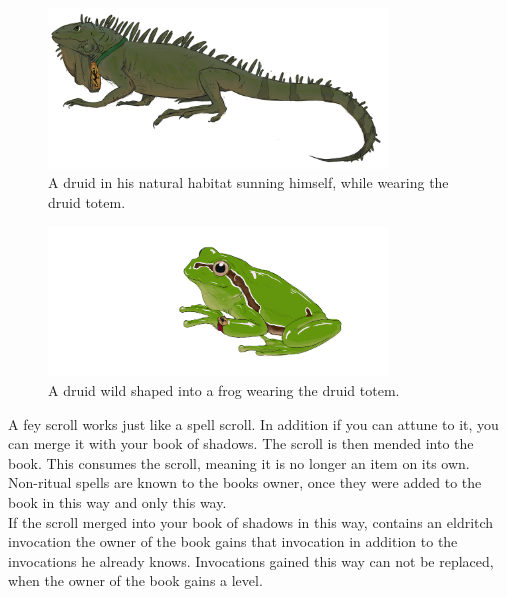 \documentclass[letter,10pt,twocolumn,openany]{dndbook}
\begin{document}
\begin{figure}
    \includegraphics[width=9cm]{images/iguana.png}
    \caption{A druid in his natural habitat sunning himself, while wearing the druid totem.}
\end{figure}

\begin{figure}
    \includegraphics[width=9cm]{images/frog.png}
    \caption{A druid wild shaped into a frog wearing the druid totem.}
\end{figure}

\pagebreak


A fey scroll works just like a spell scroll. In addition if you can attune to it, you can merge it with your book of shadows. The scroll is then mended into the book. This consumes the scroll, meaning it is no longer an item on its own.\\
Non-ritual spells are known to the books owner, once they were added to the book in this way and only this way.\\
If the scroll merged into your book of shadows in this way, contains an eldritch invocation the owner of the book gains that invocation in addition to the invocations he already knows. Invocations gained this way can not be replaced, when the owner of the book gains a level.
\end{document}
